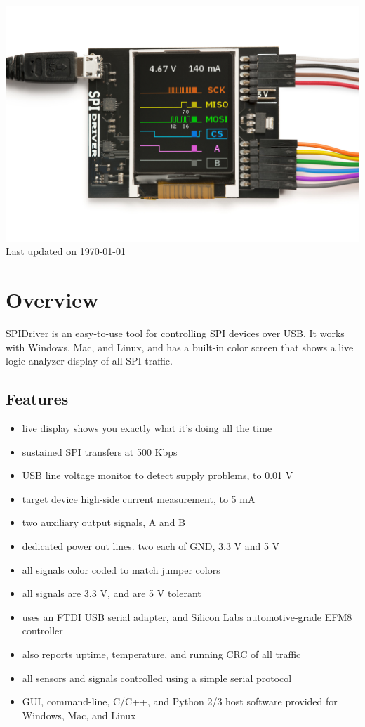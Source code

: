 \documentclass{article}
\begin{document}
\newpage
\begin{center}
\includegraphics[width=1.00\textwidth]{img/spidriver/spi_driver_topdown_wired_powered_white_bg_low}
Last updated on \today
\end{center}
\tableofcontents

\newpage

\setlength{\parindent}{0mm}
\setlength{\parskip}{1mm}

\section{Overview}

SPIDriver is an easy-to-use tool for controlling SPI devices over USB.
It works with Windows, Mac, and Linux, and has a built-in color screen that shows a live logic-analyzer display of all SPI traffic.

\subsection{Features}
\begin{itemize}
\item live display shows you exactly what it’s doing all the time
\item sustained SPI transfers at 500 Kbps
\item USB line voltage monitor to detect supply problems, to 0.01 V
\item target device high-side current measurement, to 5 mA
\item two auxiliary output signals, A and B
\item dedicated power out lines. two each of GND, 3.3 V and 5 V
\item all signals color coded to match jumper colors
\item all signals are 3.3 V, and are 5 V tolerant
\item uses an FTDI USB serial adapter, and Silicon Labs automotive-grade EFM8 controller
\item also reports uptime, temperature, and running CRC of all traffic
\item all sensors and signals controlled using a simple serial protocol
\item GUI, command-line, C/C++, and Python 2/3 host software provided for Windows, Mac, and Linux
\end{itemize}
\end{document}
